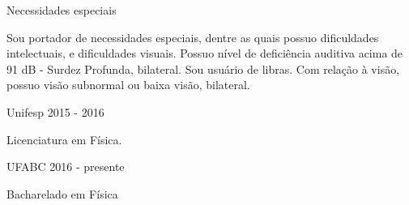 \documentclass[11pt, a4paper]{awesome-cv} %
\begin{document}
 
 
 
 
\begin{cventries} 
 
 
\cventry 
{} %
{Necessidades especiais} %
{} %
{} %
{ %
\begin{cvitems} 
\item {Sou portador de necessidades especiais, dentre as quais possuo dificuldades intelectuais,  e dificuldades visuais. Possuo nível de deficiência auditiva acima de 91 dB - Surdez Profunda, bilateral. Sou usuário de libras. Com relação à visão, possuo visão subnormal ou baixa visão, bilateral. } 
\end{cvitems} 
} 
 
 
\end{cventries}           
 


 
\begin{cventries} 
 
 
\cventry 
{} %
{Unifesp} %
{2015 - 2016} %
{} %
{ %
\begin{cvitems} 
\item {Licenciatura em Física.} 
\end{cvitems} 
} 
 
 
 
\cventry 
{} %
{UFABC} %
{2016 - presente} %
{} %
{ %
\begin{cvitems} 
\item {Bacharelado em Física} 
\end{cvitems} 
} 
 
 
 
\end{cventries} 
 
\end{document}
